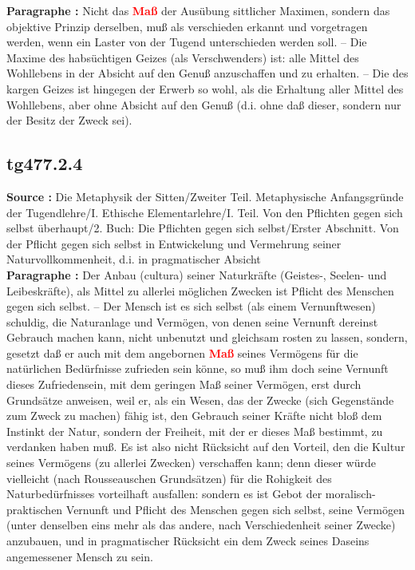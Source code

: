 \documentclass[a4paper,12pt,twoside]{book}
\newcommand{\match}[1]{\textcolor{red}{\textbf{#1}}}
\begin{document}
	\textbf{Paragraphe : }Nicht das \match{Maß} der Ausübung sittlicher Maximen, sondern das objektive Prinzip derselben, muß als verschieden erkannt und vorgetragen werden, wenn ein Laster von der Tugend unterschieden werden soll. – Die Maxime des habsüchtigen Geizes (als Verschwenders) ist: alle Mittel des Wohllebens in der Absicht auf den Genuß anzuschaffen und zu erhalten. – Die des kargen Geizes ist hingegen der Erwerb so wohl, als die Erhaltung aller Mittel des Wohllebens, aber ohne Absicht auf den Genuß (d.i. ohne daß dieser, sondern nur der Besitz der Zweck sei). 
	
	\subsection*{tg477.2.4} 
	\textbf{Source : }Die Metaphysik der Sitten/Zweiter Teil. Metaphysische Anfangsgründe der Tugendlehre/I. Ethische Elementarlehre/I. Teil. Von den Pflichten gegen sich selbst überhaupt/2. Buch: Die Pflichten gegen sich selbst/Erster Abschnitt. Von der Pflicht gegen sich selbst in Entwickelung und Vermehrung seiner Naturvollkommenheit, d.i. in pragmatischer Absicht\\  
	
	\textbf{Paragraphe : }Der Anbau (cultura) seiner Naturkräfte (Geistes-, Seelen- und Leibeskräfte), als Mittel zu allerlei möglichen Zwecken ist Pflicht des Menschen gegen sich selbst. – Der Mensch ist es sich selbst (als einem Vernunftwesen) schuldig, die Naturanlage und Vermögen, von denen seine Vernunft dereinst Gebrauch machen kann, nicht unbenutzt und gleichsam rosten zu lassen, sondern, gesetzt daß er auch mit dem angebornen \match{Maß} seines Vermögens für die natürlichen Bedürfnisse zufrieden sein könne, so muß ihm doch seine Vernunft dieses Zufriedensein, mit dem geringen Maß seiner Vermögen, erst durch Grundsätze anweisen, weil er, als ein Wesen, das der Zwecke (sich Gegenstände zum Zweck zu machen) fähig ist, den Gebrauch seiner Kräfte nicht bloß dem Instinkt der Natur, sondern der Freiheit, mit der er dieses Maß bestimmt, zu verdanken haben muß. Es ist also nicht Rücksicht auf den Vorteil, den die Kultur seines Vermögens (zu allerlei Zwecken) verschaffen kann; denn dieser würde vielleicht (nach Rousseauschen Grundsätzen) für die Rohigkeit des Naturbedürfnisses vorteilhaft ausfallen: sondern es ist Gebot der moralisch-praktischen Vernunft und Pflicht des Menschen gegen sich selbst, seine  Vermögen (unter denselben eins mehr als das andere, nach Verschiedenheit seiner Zwecke) anzubauen, und in pragmatischer Rücksicht ein dem Zweck seines Daseins angemessener Mensch zu sein. 
	
\end{document}
